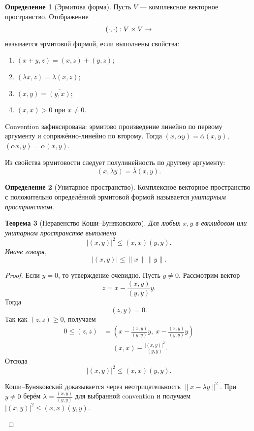\documentclass[12pt,a4paper]{article}
\theoremstyle{definition}
\newtheorem{definition}{Определение}[section]
\theoremstyle{plain}
\newtheorem{theorem}[definition]{Теорема}
\theoremstyle{remark}
\newenvironment{knowledgefix}{\begin{clarifybox}}{\end{clarifybox}}
\let\C\relax
\newcommand{\C}{\mathbb{C}}
\begin{document}
\begin{definition}[Эрмитова форма]
Пусть $V$ --- комплексное векторное пространство. Отображение
\[
    (\cdot,\cdot):V\times V\to\C
\]
называется эрмитовой формой, если выполнены свойства:
\begin{enumerate}[label=\arabic*)]
    \item $(x+y,z)=(x,z)+(y,z)$;
    \item $(\lambda x,z)=\lambda(x,z)$;
    \item $(x,y)=\overline{(y,x)}$;
    \item $(x,x)>0$ при $x\ne0$.
\end{enumerate}
\begin{knowledgefix}
Convention зафиксирована: эрмитово произведение линейно по первому аргументу и сопряжённо-линейно по второму. Тогда \((x,\alpha y)=\overline{\alpha}(x,y)\), \((\alpha x,y)=\alpha(x,y)\).
\end{knowledgefix}
\end{definition}

Из свойства эрмитовости следует полулинейность по другому аргументу:
\[
    (x,\lambda y)=\overline{\lambda}(x,y).
\]

\begin{definition}[Унитарное пространство]
Комплексное векторное пространство с положительно определённой эрмитовой формой называется \emph{унитарным пространством}.
\end{definition}

\begin{theorem}[Неравенство Коши--Буняковского]
Для любых $x,y$ в евклидовом или унитарном пространстве выполнено
\[
    |(x,y)|^2\le (x,x)(y,y).
\]
Иначе говоря,
\[
    |(x,y)|\le \|x\|\,\|y\|.
\]
\end{theorem}

\begin{proof}
Если $y=0$, то утверждение очевидно. Пусть $y\ne0$.
Рассмотрим вектор
\[
    z=x-\frac{(x,y)}{(y,y)}y.
\]
Тогда
\[
    (z,y)=0.
\]
Так как $(z,z)\ge0$, получаем
\[
\begin{aligned}
    0\le (z,z)
    &=\left(x-\frac{(x,y)}{(y,y)}y,\ x-\frac{(x,y)}{(y,y)}y\right)\\
    &=(x,x)-\frac{|(x,y)|^2}{(y,y)}.
\end{aligned}
\]
Отсюда
\[
    |(x,y)|^2\le (x,x)(y,y).
\]
\begin{knowledgefix}
Коши--Буняковский доказывается через неотрицательность \(\|x-\lambda y\|^2\). При \(y\ne0\) берём \(\lambda=\frac{(x,y)}{(y,y)}\) для выбранной convention и получаем \(|(x,y)|^2\le (x,x)(y,y)\).
\end{knowledgefix}
\end{proof}
\end{document}
